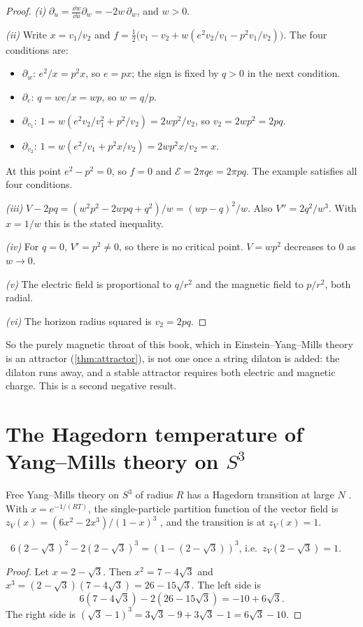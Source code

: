 \begin{proof}
\emph{(i)} $\partial_u=\frac{\dd w}{\dd u}\partial_w=-2w\,\partial_w$, and $w>0$.

\emph{(ii)} Write $x=v_1/v_2$ and $f=\frac12\bigl(v_1-v_2+w(e^2v_2/v_1-p^2v_1/v_2)\bigr)$. The four conditions are:
\begin{itemize}[nosep]
\item $\partial_w$: $e^2/x=p^2x$, so $e=px$; the sign is fixed by $q>0$ in the next condition.
\item $\partial_e$: $q=we/x=wp$, so $w=q/p$.
\item $\partial_{v_1}$: $1=w(e^2v_2/v_1^2+p^2/v_2)=2wp^2/v_2$, so $v_2=2wp^2=2pq$.
\item $\partial_{v_2}$: $1=w(e^2/v_1+p^2x/v_2)=2wp^2x/v_2=x$.
\end{itemize}
At this point $e^2-p^2=0$, so $f=0$ and $\mathcal E=2\pi qe=2\pi pq$. The example satisfies all four conditions.

\emph{(iii)} $V-2pq=(w^2p^2-2wpq+q^2)/w=(wp-q)^2/w$. Also $V''=2q^2/w^3$. With $x=1/w$ this is the stated inequality.

\emph{(iv)} For $q=0$, $V'=p^2\ne0$, so there is no critical point. $V=wp^2$ decreases to $0$ as $w\to0$.

\emph{(v)} The electric field is proportional to $q/r^2$ and the magnetic field to $p/r^2$, both radial.

\emph{(vi)} The horizon radius squared is $v_2=2pq$.
\end{proof}


So the purely magnetic throat of this book, which in Einstein--Yang--Mills theory is an attractor (\cref{thm:attractor}), is not one once a string dilaton is added: the dilaton runs away, and a stable attractor requires both electric and magnetic charge. This is a second negative result.

\section{The Hagedorn temperature of Yang--Mills theory on \texorpdfstring{$S^3$}{S3}}

Free Yang--Mills theory on $S^3$ of radius $R$ has a Hagedorn transition at large $N$ \cite{Sundborg2000,AMMPV2004}. With $x=e^{-1/(RT)}$, the single-particle partition function of the vector field is $z_V(x)=(6x^2-2x^3)/(1-x)^3$ \ext, and the transition is at $z_V(x)=1$.

\begin{theorem}\label{thm:hagedorn}\ver\
$6(2-\sqrt3)^2-2(2-\sqrt3)^3=(1-(2-\sqrt3))^3$, i.e.\ $z_V(2-\sqrt3)=1$.
\end{theorem}
\begin{proof}
Let $x=2-\sqrt3$. Then $x^2=7-4\sqrt3$ and $x^3=(2-\sqrt3)(7-4\sqrt3)=26-15\sqrt3$. The left side is
\[
6(7-4\sqrt3)-2(26-15\sqrt3)=-10+6\sqrt3 .
\]
The right side is $(\sqrt3-1)^3=3\sqrt3-9+3\sqrt3-1=6\sqrt3-10$.
\end{proof}


